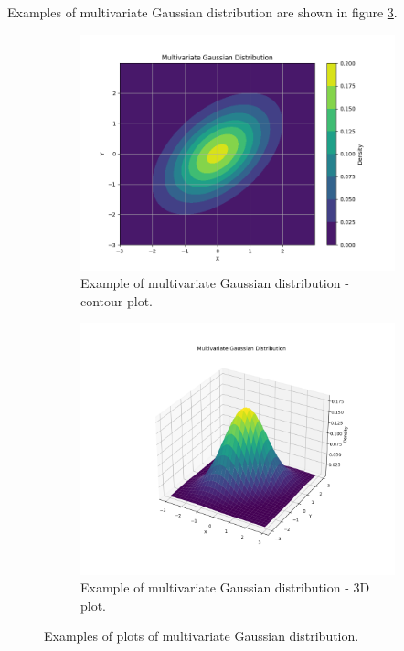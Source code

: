 Examples of multivariate Gaussian distribution are shown in figure \ref{fig:mvnplot}.
\begin{figure}[htbp]
    \centering
    \begin{subfigure}[b]{0.45\textwidth}
        \centering
        \includegraphics[width=\textwidth]{text/chapter_01/imgs/mvn_contour}
        \caption{Example of multivariate Gaussian distribution - contour plot.}
        \label{fig:mvn_contour}
    \end{subfigure}
    \hfill
    \begin{subfigure}[b]{0.45\textwidth}
        \centering
        \includegraphics[width=\textwidth]{text/chapter_01/imgs/mvn_3d}
        \caption{Example of multivariate Gaussian distribution - 3D plot.}
        \label{fig:mvn_3d}
    \end{subfigure}
    \caption{Examples of plots of multivariate Gaussian distribution.}
    \label{fig:mvnplot}
\end{figure}

